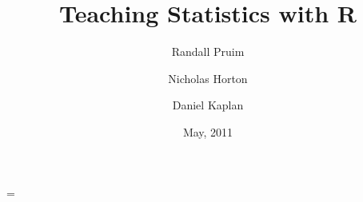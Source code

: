 \documentclass[twoside]{report}
\title{Teaching Statistics with R}
\author{
Randall Pruim
\and
Nicholas Horton 
\and 
Daniel Kaplan 
}
\date{May, 2011}
\begin{document}
\newif\ifhweave
\ifdef{\hlcomment}{\hweavetrue}{\hweavefalse}
\ifhweave
\renewenvironment{Hchunk}%
{%
\vspace{0.5em}\noindent\begin{lrbox}{\highlightbox}%
\begin{minipage}[b]{\Rwidth}%
}%
{%
\end{minipage}%
\end{lrbox}%
\fcolorbox{highlightBg}{highlightBg}{\usebox{\highlightbox}}%
\vspace{0.5em}}%

\renewcommand{\hlcomment}[1]{\textcolor[rgb]{0.4,0.4,0.3}{#1}}%
\fi
\Rwidth=\textwidth

\parindent=0pt
\parskip=3mm

\end{document}
